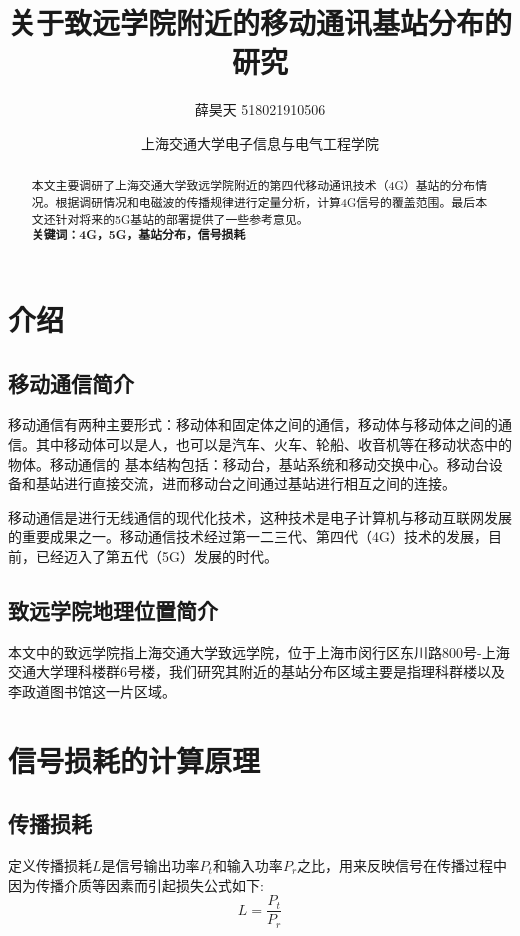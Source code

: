 \documentclass{article}
\begin{document}
\title{关于致远学院附近的移动通讯基站分布的研究}
\author{薛昊天 518021910506}
\date{\small{上海交通大学${ }$电子信息与电气工程学院}}
\maketitle
\begin{abstract}
   本文主要调研了上海交通大学致远学院附近的第四代移动通讯技术（4G）基站的分布情况。根据调研情况和电磁波的传播规律进行定量分析，计算4G信号的覆盖范围。最后本文还针对将来的5G基站的部署提供了一些参考意见。\\
  \textbf{关键词：4G，5G，基站分布，信号损耗}
\end{abstract}

\section{介绍}

\subsection{移动通信简介}
  移动通信有两种主要形式：移动体和固定体之间的通信，移动体与移动体之间的通信。其中移动体可以是人，也可以是汽车、火车、轮船、收音机等在移动状态中的物体。移动通信的 基本结构包括：移动台，基站系统和移动交换中心。移动台设备和基站进行直接交流，进而移动台之间通过基站进行相互之间的连接。
  
   移动通信是进行无线通信的现代化技术，这种技术是电子计算机与移动互联网发展的重要成果之一。移动通信技术经过第一二三代、第四代（4G）技术的发展，目前，已经迈入了第五代（5G）发展的时代。
   
\subsection{致远学院地理位置简介} 
   本文中的致远学院指上海交通大学致远学院，位于上海市闵行区东川路800号-上海交通大学理科楼群6号楼，我们研究其附近的基站分布区域主要是指理科群楼以及李政道图书馆这一片区域。



\section{信号损耗的计算原理}
   \subsection{传播损耗}
   定义传播损耗$L$是信号输出功率$P_t$和输入功率$P_r$之比，用来反映信号在传播过程中因为传播介质等因素而引起损失公式如下:
   \begin{equation}
       L = \frac{P_t}{P_r}
   \end{equation}
   
\end{document}
